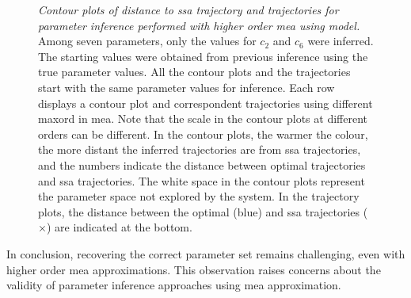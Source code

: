 \begin{figure}
\caption{\emph{Contour plots of distance to \gls{ssa} trajectory and trajectories for parameter inference performed with higher order \gls{mea} using \pft{} model.}  
    Among seven parameters, only the values for $c_2$ and $c_6$ were inferred. The starting values were obtained from previous inference using the true parameter values.
    All the contour plots and the trajectories start with the same parameter values for inference.
    Each row displays a contour plot and correspondent trajectories using different \gls{maxord} in \gls{mea}.
    Note that the scale in the contour plots at different orders can be different.
    In the contour plots, the warmer the colour, the more distant the inferred trajectories are from \gls{ssa} trajectories, and the numbers indicate the distance between optimal trajectories and \gls{ssa} trajectories.
    The white space in the contour plots represent the parameter space not explored by the system. 
    In the trajectory plots, the distance between the optimal (blue) and \gls{ssa} trajectories ($\times$) are indicated at the bottom.}
\label{fig:inference_phenomenon:higher_order}
\end{figure}



In conclusion, recovering the correct parameter set remains challenging, even with higher order \gls{mea} approximations. This observation raises concerns about the validity of parameter inference approaches using \gls{mea} approximation. 
